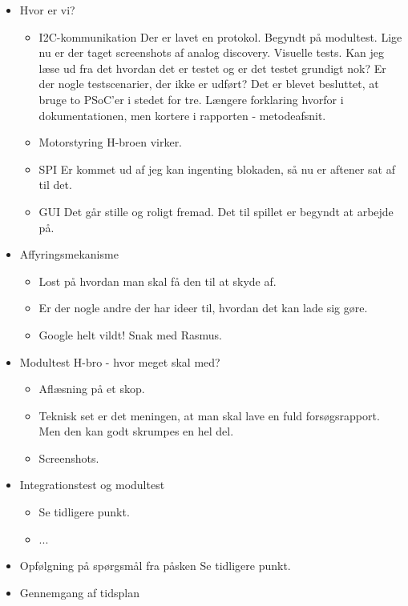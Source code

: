 \documentclass{article}
\begin{document}
\begin{itemize}
		\item Hvor er vi? 
		\begin{itemize}
			\item I2C-kommunikation
			\subitem Der er lavet en protokol.
			\subitem Begyndt på modultest. 
			\subitem Lige nu er der taget screenshots af analog discovery. Visuelle tests. Kan jeg læse ud fra det hvordan det er testet og er det testet grundigt nok? Er der nogle testscenarier, der ikke er udført? 
			\subitem Det er blevet besluttet, at bruge to PSoC'er i stedet for tre. 
			\subitem Længere forklaring hvorfor i dokumentationen, men kortere i rapporten - metodeafsnit. 
			\item Motorstyring
			\subitem H-broen virker. 
			\subitem 
			\item SPI
			\subitem Er kommet ud af jeg kan ingenting blokaden, så nu er aftener sat af til det. 
			\item GUI 
			\subitem Det går stille og roligt fremad. 
			\subitem Det til spillet er begyndt at arbejde på. 
		\end{itemize}
		\item Affyringsmekanisme
		\begin{itemize}
			\item Lost på hvordan man skal få den til at skyde af. 
			\item Er der nogle andre der har ideer til, hvordan det kan lade sig gøre. 
			\item Google helt vildt! Snak med Rasmus. 
		\end{itemize}
		\item Modultest H-bro - hvor meget skal med? 
		\begin{itemize}
			\item Aflæsning på et skop. 
			\item Teknisk set er det meningen, at man skal lave en fuld forsøgsrapport. Men den kan godt skrumpes en hel del. 
			\item Screenshots. 
		\end{itemize}
		\item Integrationstest og modultest
		\begin{itemize}
			\item Se tidligere punkt. 
			\item ...
		\end{itemize}
		\item Opfølgning på spørgsmål fra påsken
		\subitem Se tidligere punkt. 
		\item Gennemgang af tidsplan
		\begin{itemize}

\end{itemize}
\end{itemize}
\end{document}
